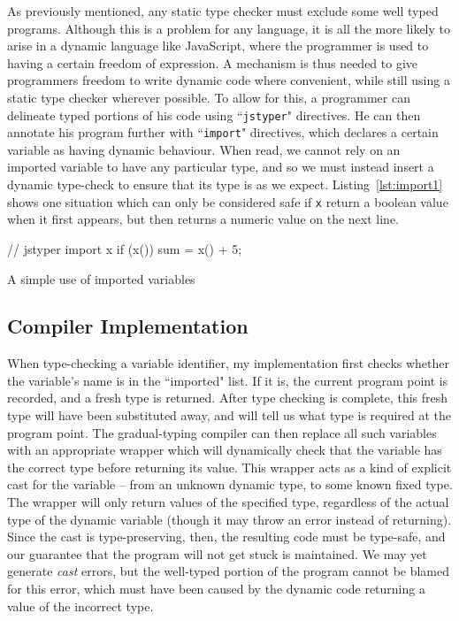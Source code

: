 \documentclass[12pt,a4paper,twoside,openright]{report}
\theoremstyle{definition}
\theoremstyle{dotless}
\newcommand*{\js}{\texttt}
\begin{document}
As previously mentioned, any static type checker must exclude some well typed
programs.  Although this is a problem for any language, it is all the more
likely to arise in a dynamic language like JavaScript, where the programmer is
used to having a certain freedom of expression. A mechanism is thus needed to
give programmers freedom to write dynamic code where convenient, while still
using a static type checker wherever possible. To allow for this, a programmer
can delineate typed portions of his code using ``\js{jstyper}" directives.
He can then annotate his program further with ``\js{import}" directives, which declares a certain
variable as having dynamic behaviour. When read, we cannot rely on an imported
variable to have any particular type, and so we must instead insert a dynamic
type-check to ensure that its type is as we expect.
Listing~\ref{lst:import1} shows one situation which can only be considered safe if
\js{x} return a boolean value when it first appears, but then returns a numeric value on
the next line. 
\begin{listing}
  \begin{jscript}
	// jstyper import x
	if (x()) {
	  sum = x() + 5;
	}
  \end{jscript}
  \caption{A simple use of imported variables}\label{lst:import1}
\end{listing}

\subsection{Compiler Implementation}

When type-checking a variable identifier, my implementation first checks
whether the variable's name is in the ``imported" list. If it is, the current
program point is recorded, and a fresh type is returned. After type checking is
complete, this fresh type will have been substituted away, and will tell us
what type is required at the program point. The gradual-typing compiler can
then replace all such variables with an appropriate wrapper which will
dynamically check that the variable has the correct type before
returning its value.  This wrapper acts as a kind of explicit cast for the
variable -- from an unknown dynamic type, to some known fixed type. The wrapper
will only return values of the specified type, regardless of the actual type of
the dynamic variable (though it may throw an error instead of returning).
Since the cast is type-preserving, then, the resulting code must be type-safe,
and our guarantee that the program will not get stuck is maintained. We may yet
generate \textit{cast} errors,
but the well-typed portion of the program cannot be blamed for this error,
which must have been caused by the dynamic code returning a value of the
incorrect type. 
\end{document}
